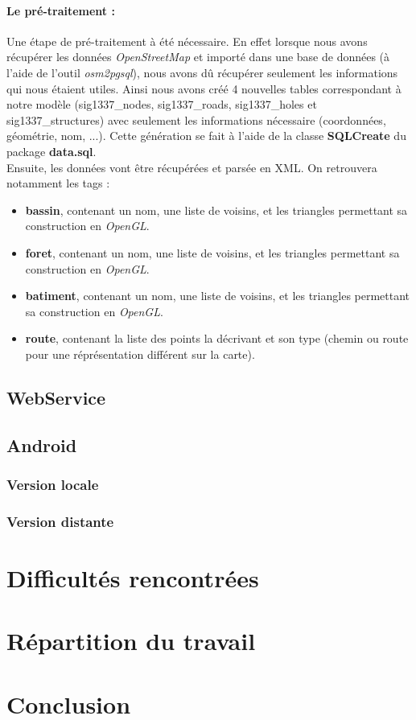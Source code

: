 \documentclass[12pt,a4paper,oneside]{article}
\begin{document}
\paragraph{Le pré-traitement : \\}
Une étape de pré-traitement à été nécessaire. En effet lorsque nous avons récupérer les données \textit{OpenStreetMap} et importé dans une base de données (à l'aide de l'outil \textit{osm2pgsql}), nous avons dû récupérer seulement les informations qui nous étaient utiles. Ainsi nous avons créé 4 nouvelles tables correspondant à notre modèle (sig1337\_nodes, sig1337\_roads, sig1337\_holes et sig1337\_structures) avec seulement les informations nécessaire (coordonnées, géométrie, nom, ...). Cette génération se fait à l'aide de la classe \textbf{SQLCreate} du package \textbf{data.sql}. \\
Ensuite, les données vont être récupérées et parsée en XML. On retrouvera notamment les tags :
\begin{itemize}
\item \textbf{bassin}, contenant un nom, une liste de voisins, et les triangles permettant sa construction en \textit{OpenGL}.
\item \textbf{foret}, contenant un nom, une liste de voisins, et les triangles permettant sa construction en \textit{OpenGL}.
\item \textbf{batiment}, contenant un nom, une liste de voisins, et les triangles permettant sa construction en \textit{OpenGL}.
\item \textbf{route}, contenant la liste des points la décrivant et son type (chemin ou route pour une réprésentation différent sur la carte).
\end{itemize}

\subsection{WebService}

\subsection{Android}
\subsubsection{Version locale}
\subsubsection{Version distante}


\section{Difficultés rencontrées}


\section{Répartition du travail}


\section{Conclusion}


\appendix
\end{document}
